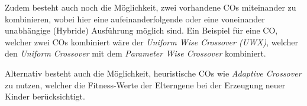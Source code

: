 	Zudem besteht auch noch die Möglichkeit, zwei vorhandene COs miteinander zu kombinieren, wobei hier eine aufeinanderfolgende oder eine voneinander unabhängige (Hybride) Ausführung möglich sind. Ein Beispiel für eine CO, welcher zwei COs kombiniert wäre der \textit{Uniform Wise Crossover (UWX)}, welcher den \textit{Uniform Crossover} mit dem \textit{Parameter Wise Crossover} kombiniert. \cite{ElectromagneticRealEncoding}
	
	Alternativ besteht auch die Möglichkeit, heuristische COs wie \zB \textit{Adaptive Crossover} zu nutzen, welcher die Fitness-Werte der Elterngene bei der Erzeugung neuer Kinder berücksichtigt.